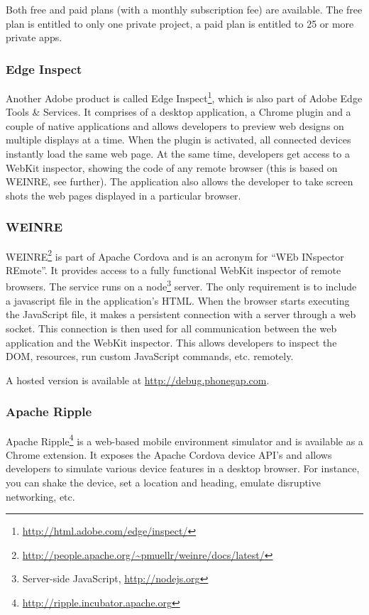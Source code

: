 Both free and paid plans (with a monthly subscription fee) are available. The free plan is entitled to only one private project, a paid plan is entitled to 25 or more private apps.

\subsubsection{Edge Inspect}

Another Adobe product is called Edge Inspect\footnote{\url{http://html.adobe.com/edge/inspect/}}, which is also part of Adobe Edge Tools \& Services. It comprises of a desktop application, a Chrome plugin and a couple of native applications and allows developers to preview web designs on multiple displays at a time. When the plugin is activated, all connected devices instantly load the same web page. At the same time, developers get access to a WebKit inspector, showing the code of any remote browser (this is based on WEINRE, see further). The application also allows the developer to take screen shots the web pages displayed in a particular browser.

\subsubsection{WEINRE}

WEINRE\footnote{\url{http://people.apache.org/~pmuellr/weinre/docs/latest/}} is part of Apache Cordova and is an acronym for ``WEb INspector REmote''. It provides access to a fully functional WebKit inspector of remote browsers. The service runs on a node\footnote{Server-side JavaScript, \url{http://nodejs.org}} server. The only requirement is to include a javascript file in the application's HTML. When the browser starts executing the JavaScript file, it makes a persistent connection with a server through a web socket. This connection is then used for all communication between the web application and the WebKit inspector. This allows developers to inspect the DOM, resources, run custom JavaScript commands, etc. remotely.

A hosted version is available at \url{http://debug.phonegap.com}.

\subsubsection{Apache Ripple}

Apache Ripple\footnote{\url{http://ripple.incubator.apache.org}} is a web-based mobile environment simulator and is available as a Chrome extension. It exposes the Apache Cordova device API's and allows developers to simulate various device features in a desktop browser. For instance, you can shake the device, set a location and heading, emulate disruptive networking, etc.

